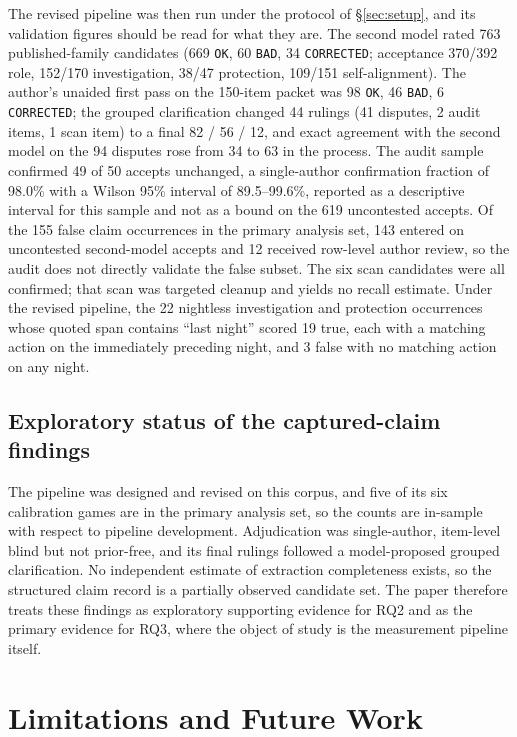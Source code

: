 \documentclass[11pt]{article}
\newcommand{\code}[1]{\texttt{#1}}
\begin{document}
The revised pipeline was then run under the protocol of \S\ref{sec:setup}, and its validation figures should be read for what they are. The second model rated 763 published-family candidates (669 \code{OK}, 60 \code{BAD}, 34 \code{CORRECTED}; acceptance 370/392 role, 152/170 investigation, 38/47 protection, 109/151 self-alignment). The author's unaided first pass on the 150-item packet was 98 \code{OK}, 46 \code{BAD}, 6 \code{CORRECTED}; the grouped clarification changed 44 rulings (41 disputes, 2 audit items, 1 scan item) to a final 82 / 56 / 12, and exact agreement with the second model on the 94 disputes rose from 34 to 63 in the process. The audit sample confirmed 49 of 50 accepts unchanged, a single-author confirmation fraction of 98.0\% with a Wilson 95\% interval of 89.5--99.6\%, reported as a descriptive interval for this sample and not as a bound on the 619 uncontested accepts. Of the 155 false claim occurrences in the primary analysis set, 143 entered on uncontested second-model accepts and 12 received row-level author review, so the audit does not directly validate the false subset. The six scan candidates were all confirmed; that scan was targeted cleanup and yields no recall estimate. Under the revised pipeline, the 22 nightless investigation and protection occurrences whose quoted span contains ``last night'' scored 19 true, each with a matching action on the immediately preceding night, and 3 false with no matching action on any night.

\subsection{Exploratory status of the captured-claim findings}

The pipeline was designed and revised on this corpus, and five of its six calibration games are in the primary analysis set, so the counts are in-sample with respect to pipeline development. Adjudication was single-author, item-level blind but not prior-free, and its final rulings followed a model-proposed grouped clarification. No independent estimate of extraction completeness exists, so the structured claim record is a partially observed candidate set. The paper therefore treats these findings as exploratory supporting evidence for RQ2 and as the primary evidence for RQ3, where the object of study is the measurement pipeline itself.

\section{Limitations and Future Work}
\label{sec:limitations}
\end{document}

